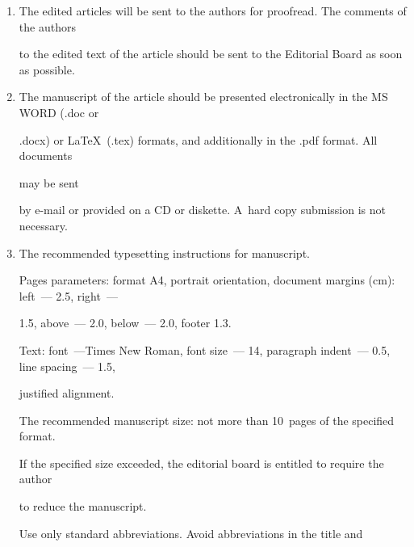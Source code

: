 {{\begin{enumerate}[1.]
\item The edited articles will be sent to the authors for proofread. The comments of the authors


to the edited text of the article should be sent to the Editorial Board as soon as possible.\\[-14pt]





\item The manuscript of the article should be presented electronically in the MS WORD (.doc or


.docx) or \LaTeX\ (.tex) formats, and additionally in the .pdf format. All documents


 may be sent


by e-mail or provided on a CD or diskette. A~hard copy submission is not necessary.





\vspace*{-12pt}





\pagebreak





\item The recommended typesetting instructions for manuscript.





Pages parameters: format A4, portrait orientation, document margins (cm): left~--- 2.5, right~---


1.5, above~--- 2.0, below~--- 2.0, footer 1.3.





Text: font~---Times New Roman, font size~--- 14, paragraph indent~--- 0.5, line spacing~--- 1.5,


justified alignment.





The recommended manuscript size: not more than 10~pages of the specified format.


If the specified size exceeded, the editorial board is entitled to require the author


to reduce the manuscript.





Use only standard abbreviations. Avoid  abbreviations in the title and



\end{enumerate}}}
